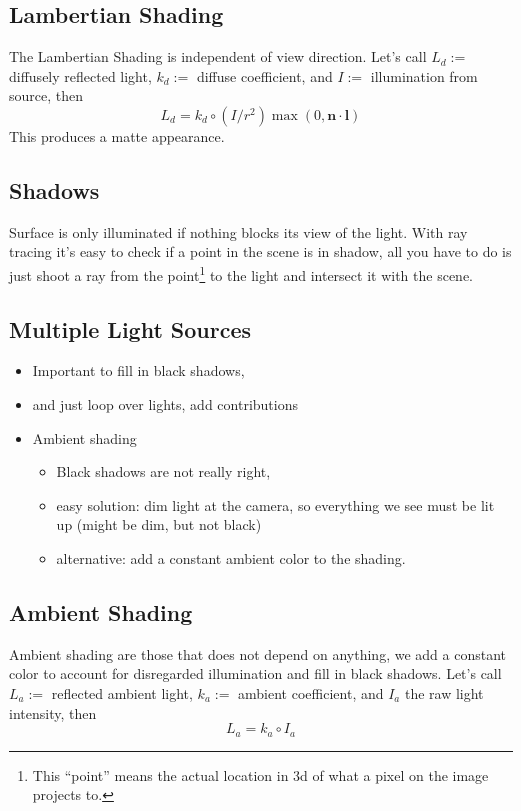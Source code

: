 \documentclass[11pt]{article}
\begin{document}
\subsection{Lambertian Shading} 
The Lambertian Shading is independent of view direction. Let's call $L_d:=$ diffusely reflected light, $k_d:=$ diffuse coefficient, and $I:=$ illumination from source, then 
\begin{equation}
	L_{d}=k_{d}\circ \left(I / r^{2}\right) \max (0, \mathbf{n} \cdot \mathbf{l})
\end{equation}
This produces a matte appearance. 

\subsection{Shadows}
Surface is only illuminated if nothing blocks its view of the light. With ray tracing it's easy to check if a point in the scene is in shadow, all you have to do is just shoot a ray from the point\footnote{This ``point'' means the actual location in 3d of what a pixel on the image projects to. } to the light and intersect it with the scene.

\subsection{Multiple Light Sources}
\begin{itemize}
	\item Important to fill in black shadows, 
	\item and just loop over lights, add contributions
	\item Ambient shading
	\begin{itemize}
		\item Black shadows are not really right, 
		\item easy solution: dim light at the camera, so everything we see must  be lit up (might be dim, but not black)
		\item alternative: add a constant ambient color to the shading. 
	\end{itemize}
\end{itemize}

\subsection{Ambient Shading}
Ambient shading are those that does not depend on anything, we add a constant color to account for disregarded illumination and fill in black shadows. Let's call $L_a:=$ reflected ambient light, $k_a:=$ ambient coefficient, and $I_a$ the raw light intensity, then
\begin{equation}
	L_a = k_a \circ I_a
\end{equation}
\end{document}
